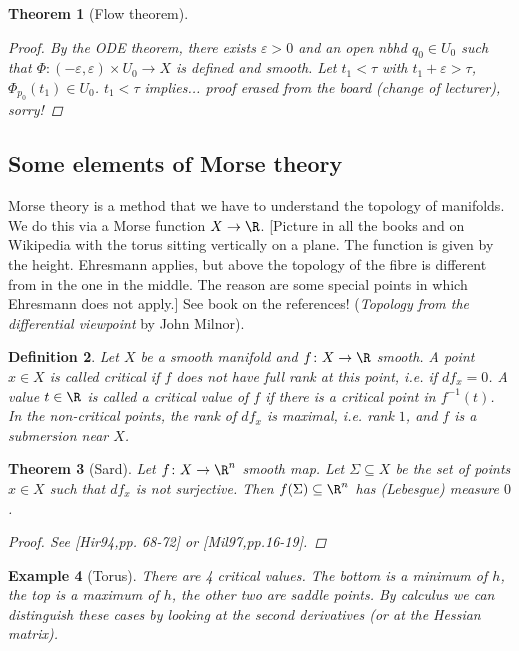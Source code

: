 \documentclass[A4paper, british]{amsart}
\theoremstyle{darkgreentheorem}
\newtheorem{thm}{Theorem}[section]
\theoremstyle{darkbluedefinition}
\newtheorem{defn}[thm]{Definition}
\theoremstyle{darkredexample}
\newtheorem{exa}[thm]{Example}
\theoremstyle{remark}
\newcommand{\1}{\mathbbm{1}}
\newcommand{\tms}{\times}
\newcommand{\sub}{\subseteq}
\begin{document}
\begin{thm}[Flow theorem]
\begin{proof}
	By the ODE theorem, there exists $\varepsilon >0$ and an open nbhd $q_{0}\in U_{0}$ such that $\Phi\colon (-\varepsilon, \varepsilon)\tms U_{0}\to X$ is defined and smooth.
	Let $t_{1}<\tau$ with $t_{1}+\varepsilon >\tau$, $\Phi_{p_{0}}(t_{1})\in U_{0}$.
	$t_{1}<\tau$ implies... proof erased from the board (change of lecturer), sorry!
    \end{proof}
\end{thm}

\subsection{Some elements of Morse theory}

Morse theory is a method that we have to understand the topology of manifolds.
We do this via a Morse function $X\to \R$.
[Picture in all the books and on Wikipedia with the torus sitting vertically on a plane.
The function is given by the height.
Ehresmann applies, but above the topology of the fibre is different from in the one in the middle.
The reason are some special points in which Ehresmann does not apply.]
See book on the references! (\textit{Topology from the differential viewpoint} by John Milnor).

\begin{defn}
    Let $X$ be a smooth manifold and $f\colon X\to \R$ smooth.
    A point $x\in X$ is called \textit{critical} if $f$ does not have full rank at this point, i.e. if $df_{x}=0$.
    A value $t\in \R$ is called a \textit{critical value} of $f$ if there is a critical point in $f^{-1}(t)$.
    In the non-critical points, the rank of $df_{x}$ is maximal, i.e. rank $1$, and $f$ is a submersion near $X$.
\end{defn}

\begin{thm}[Sard]
    Let $f\colon X\to \R^{n}$ smooth map.
    Let $\Sigma\sub X$ be the set of points $x\in X$ such that $df_{x}$ is not surjective.
    Then $f(\Sigma)\sub \R^{n}$ has (Lebesgue) measure $0$.
    \begin{proof}
	See [Hir94,pp. 68-72] or [Mil97,pp.16-19].
    \end{proof}
\end{thm}

\begin{exa}[Torus]
    There are 4 critical values.
    The bottom is a minimum of $h$, the top is a maximum of $h$, the other two are saddle points.
    By calculus we can distinguish these cases by looking at the second derivatives (or at the Hessian matrix).
\end{exa}
\end{document}
